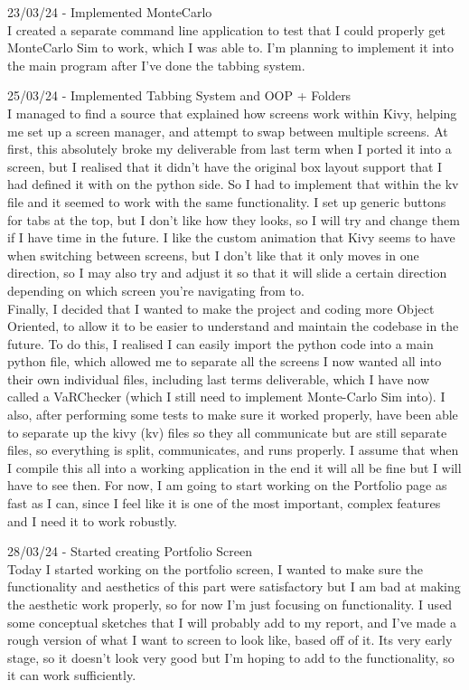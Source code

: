 \documentclass{article}
\begin{document}
23/03/24 - Implemented MonteCarlo\\
I created a separate command line application to test that I could properly get MonteCarlo Sim to work, which I was able to. I'm planning to implement it into the main program after I've done the tabbing system.\\\vspace{0.3cm}

25/03/24 - Implemented Tabbing System and OOP + Folders\\
I managed to find a source that explained how screens work within Kivy, helping me set up a screen manager, and attempt to swap between multiple screens. At first, this absolutely broke my deliverable from last term when I ported it into a screen, but I realised that it didn't have the original box layout support that I had defined it with on the python side. So I had to implement that within the kv file and it seemed to work with the same functionality. I set up generic buttons for tabs at the top, but I don't like how they looks, so I will try and change them if I have time in the future. I like the custom animation that Kivy seems to have when switching between screens, but I don't like that it only moves in one direction, so I may also try and adjust it so that it will slide a certain direction depending on which screen you're navigating from to. \\Finally, I decided that I wanted to make the project and coding more Object Oriented, to allow it to be easier to understand and maintain the codebase in the future. To do this, I realised I can easily import the python code into a main python file, which allowed me to separate all the screens I now wanted all into their own individual files, including last terms deliverable, which I have now called a VaRChecker (which I still need to implement Monte-Carlo Sim into). I also, after performing some tests to make sure it worked properly, have been able to separate up the kivy (kv) files so they all communicate but are still separate files, so everything is split, communicates, and runs properly. I assume that when I compile this all into a working application in the end it will all be fine but I will have to see then. For now, I am going to start working on the Portfolio page as fast as I can, since I feel like it is one of the most important, complex features and I need it to work robustly. \\\vspace{0.3cm}

28/03/24 - Started creating Portfolio Screen\\
Today I started working on the portfolio screen, I wanted to make sure the functionality and aesthetics of this part were satisfactory but I am bad at making the aesthetic work properly, so for now I'm just focusing on functionality. I used some conceptual sketches that I will probably add to my report, and I've made a rough version of what I want to screen to look like, based off of it. Its very early stage, so it doesn't look very good but I'm hoping to add to the functionality, so it can work sufficiently.\\\vspace{0.3cm}
\end{document}

